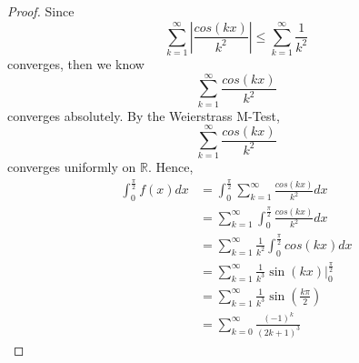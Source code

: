 \begin{Exercise}
\begin{proof}
Since $$\sum_{k=1}^{\infty}\left| \frac{cos(kx)}{k^2} \right| \leq \sum_{k=1}^{\infty}\frac{1}{k^2}$$ converges, then we know $$\sum_{k=1}^{\infty}\frac{cos(kx)}{k^2}$$ converges absolutely. By the Weierstrass M-Test, $$\sum_{k=1}^{\infty}\frac{cos(kx)}{k^2}$$ converges uniformly on $\mathbb{R}$. Hence,
\begin{align*}
\int_{0}^{\frac{\pi}{2}} f(x) dx
&= \int_{0}^{\frac{\pi}{2}}\sum_{k=1}^{\infty}\frac{cos(kx)}{k^2} dx \\
&= \sum_{k=1}^{\infty}\int_{0}^{\frac{\pi}{2}} \frac{cos(kx)}{k^2} dx \\
&= \sum_{k=1}^{\infty}\frac{1}{k^2}\int_{0}^{\frac{\pi}{2}} cos(kx) dx \\
&= \sum_{k=1}^{\infty}\frac{1}{k^3}\left. \sin(kx) \right|_{0}^{\frac{\pi}{2}} \\
&= \sum_{k=1}^{\infty}\frac{1}{k^3}\sin(\frac{k\pi}{2}) \\
&= \sum_{k=0}^{\infty}\frac{(-1)^k}{(2k+1)^3}
\end{align*}
\end{proof}
\end{Exercise}